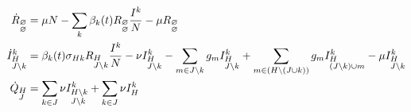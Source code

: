 \begin{footnotesize}
  \begin{align}
    \label{eq:fullQferg}
    \dot{R}_{\begin{subarray}{l}\varnothing \\
        \varnothing \end{subarray}} &= \mu N -\sum_k \beta_k(t) R_{\begin{subarray}{l}\varnothing \\ \varnothing \end{subarray}} \frac{I^k}{N} - \mu R_{\begin{subarray}{l}\varnothing \\ \varnothing \end{subarray}}\\
    \dot{I}^k_{\begin{subarray}{l}H\\ J \setminus k \end{subarray}} &=
    \beta_k(t) \sigma_{Hk} R_{\begin{subarray}{l}H \\ J\setminus
        k \end{subarray}} \frac{I^k}{N} -\nu I^k_{\begin{subarray}{l}H
        \\ J \setminus k \end{subarray}} -\sum_{m \in J \setminus k}
    g_m I^k_{\begin{subarray}{l}H \\ J \setminus k \end{subarray}} +
    \sum_{m \in (H \setminus (J \cup k))} g_m
    I^k_{\begin{subarray}{l}H \\ (J \setminus k) \cup
        m \end{subarray}}
    -\mu I^k_{\begin{subarray}{l}H \\ J \setminus k \end{subarray}} \notag \\
    \dot{Q}_{\begin{subarray}{l}H\\ J \end{subarray}} &= \sum_{k \in
      J} \nu I^k_{\begin{subarray}{l}H \setminus k \\ J \setminus
        k \end{subarray}} +\sum_{k \in J} \nu I^k_{\begin{subarray}{l}H \\

\end{subarray}}
\end{align}
\end{footnotesize}
